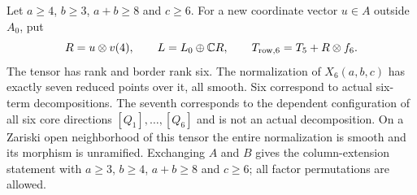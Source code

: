 \begin{theorem}
\label{nf:rank-six}
Let $a\geq4$, $b\geq3$, $a+b\geq8$ and $c\geq6$. For a new
coordinate vector $u\in A$ outside $A_0$, put
\[
 R=u\otimes v(4),\qquad L=L_0\oplus\mathbb C R,\qquad
 T_{\mathrm{row},6}=T_5+R\otimes f_6.
\]
The tensor has rank and border rank six. The normalization of
$X_6(a,b,c)$ has exactly seven reduced points over it, all smooth.
Six correspond to actual six-term decompositions. The seventh
corresponds to the dependent configuration of all six core directions
$[Q_1],\ldots,[Q_6]$ and is not an actual decomposition. On a
Zariski open neighborhood of this tensor the entire normalization is
smooth and its morphism is unramified. Exchanging $A$ and $B$ gives
the column-extension statement with $a\geq3$, $b\geq4$,
$a+b\geq8$ and $c\geq6$; all factor permutations are allowed.
\end{theorem}

